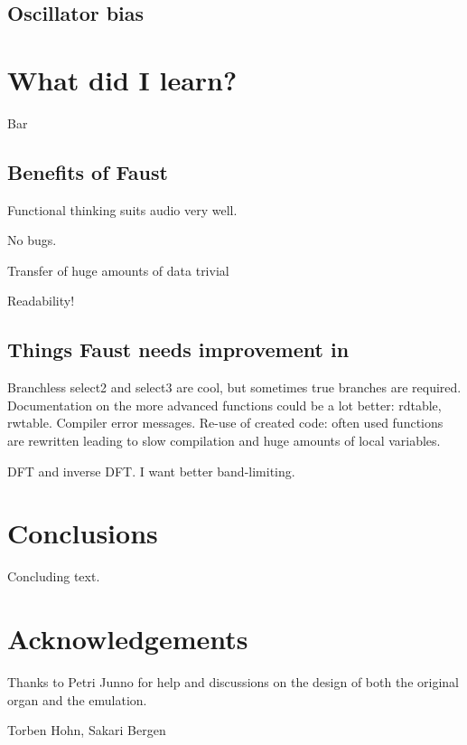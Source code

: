 \documentclass[11pt,a4paper]{article}
\begin{document}
\subsection{Oscillator bias}
\label{section:oscillator-bias}

\section{What did I learn?}

Bar


\subsection{Benefits of Faust}

Functional thinking suits audio very well.

No bugs.

Transfer of huge amounts of data trivial

Readability!


\subsection{Things Faust needs improvement in}

Branchless select2 and select3 are cool, but sometimes true branches are required.
Documentation on the more advanced functions could be a lot better: rdtable, rwtable.
Compiler error messages.
Re-use of created code: often used functions are rewritten leading to slow compilation and huge amounts of local variables.

DFT and inverse DFT. I want better band-limiting.

\section{Conclusions}

Concluding text.

\section{Acknowledgements}

Thanks to Petri Junno for help and discussions on the design of both the original organ and the emulation.

Torben Hohn, Sakari Bergen





\end{document}
